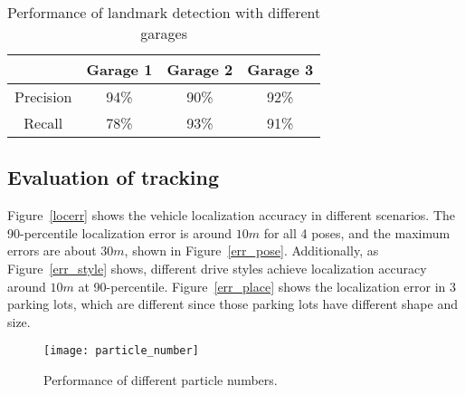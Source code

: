\begin{table}[!hbp]
\caption{Performance of landmark detection with different garages}
\centering
\begin{tabular}{|c|c|c|c|}
\hline
 & Garage 1& Garage 2& Garage 3\\
\hline
Precision & 94\% & 90\% & 92\%\\
\hline
Recall & 78\% & 93\% & 91\%\\
\hline
\end{tabular}
\label{tab:place_precision}
\end{table}



\subsection{Evaluation of tracking}

\begin{figure*}[t]
      \centering
      \vspace{-2pt}
        \caption{Vehicle localization errors in different scenarios: (a) 4 different poses. (b) 3 different cars and drivers in one parking lot. (c) 3 different parking lots. }\label{locerr}
\end{figure*}

Figure~\ref{locerr} shows the vehicle localization accuracy in different scenarios. The 90-percentile localization error is around $10m$ for all 4 poses, and the maximum errors are about $30m$, shown in Figure~\ref{err_pose}.
Additionally, as Figure~\ref{err_style} shows, different drive styles achieve localization accuracy around $10m$ at 90-percentile.
Figure~\ref{err_place} shows the localization error in 3 parking lots, which are different since those parking lots have different shape and size.




\begin{figure}[h]
  \centering
  \texttt{[image: particle\_number]}\\
  \caption{Performance of different particle numbers. }\label{pix:particle_number}
\end{figure}


